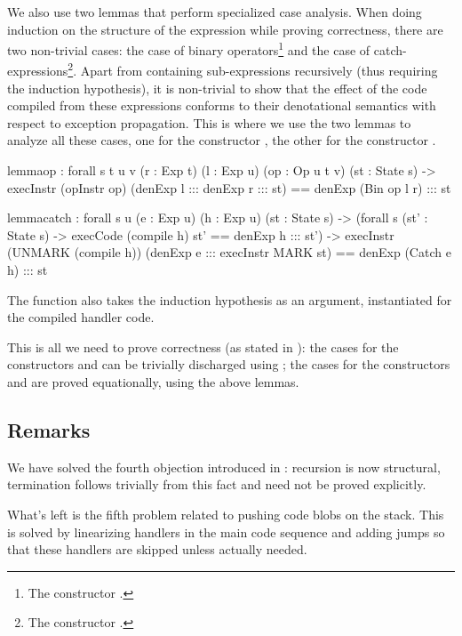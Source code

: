 \noindent We also use two lemmas that perform specialized case analysis. When
doing induction on the structure of the expression while proving correctness,
there are two non-trivial cases: the case of binary operators\footnote{The
constructor .} and the case of catch-expressions\footnote{The
constructor .}. Apart from containing sub-expressions recursively
(thus requiring the induction hypothesis), it is non-trivial to show that the
effect of the code compiled from these expressions conforms to their
denotational semantics with respect to exception propagation.  This is where we
use the two lemmas to analyze all these cases, one for the constructor
, the other for the constructor .

\begin{code}
  lemma\-op : forall {s t u v} (r : Exp t) (l : Exp u) (op : Op u t v) (st : State s)
    -> execInstr (opInstr op) (denExp l ::: denExp r ::: st)
      == denExp (Bin op l r) ::: st
\end{code}

\begin{code}
  lemma\-catch : forall {s u} (e : Exp u) (h : Exp u) (st : State s)
    -> (forall {s} (st' : State s) -> execCode (compile h) st' == denExp h ::: st')
    -> execInstr (UNMARK (compile h)) (denExp e ::: execInstr MARK st)
      == denExp (Catch e h) ::: st
\end{code}

The function  also takes the induction hypothesis as an
argument, instantiated for the compiled handler code.

This is all we need to prove correctness (as stated in
): the cases for the constructors  and
 can be trivially discharged using ; the cases for the
constructors  and  are proved equationally, using the
above lemmas.

\subsection{Remarks}

We have solved the fourth objection introduced in
: recursion is now structural, termination
follows trivially from this fact and need not be proved explicitly.

What's left is the fifth problem related to pushing code blobs on the stack.
This is solved by linearizing handlers in the main code sequence and adding
jumps so that these handlers are skipped unless actually needed.

